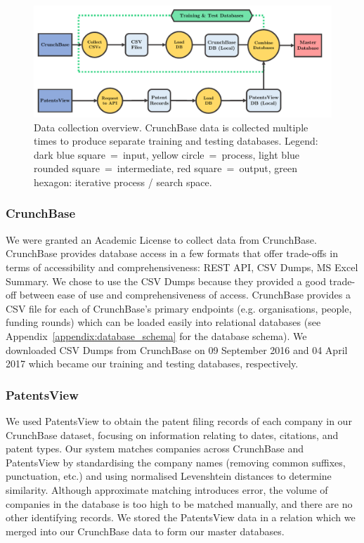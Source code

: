 \documentclass[../thesis/thesis.tex]{subfiles}
\begin{document}
\begin{figure}[!htb]
    \centering
    \includegraphics[width=\textwidth]{../figures/design/flowchart_data_collection}
    \caption[Data collection flowchart]{Data collection overview. CrunchBase data is collected multiple times to produce separate training and testing databases. Legend: dark blue square~=~input, yellow circle~=~process, light blue rounded square~=~intermediate, red square~=~output, green hexagon: iterative process / search space.}
    \label{fig:design:data_collection}
\end{figure}

\subsubsection{CrunchBase}

We were granted an Academic License to collect data from CrunchBase. CrunchBase provides database access in a few formats that offer trade-offs in terms of accessibility and comprehensiveness: REST API, CSV Dumps, MS Excel Summary. We chose to use the CSV Dumps because they provided a good trade-off between ease of use and comprehensiveness of access. CrunchBase provides a CSV file for each of CrunchBase's primary endpoints (e.g. organisations, people, funding rounds) which can be loaded easily into relational databases (see Appendix~\ref{appendix:database_schema} for the database schema). We downloaded CSV Dumps from CrunchBase on 09 September 2016 and 04 April 2017 which became our training and testing databases, respectively.

\subsubsection{PatentsView}

We used PatentsView to obtain the patent filing records of each company in our CrunchBase dataset, focusing on information relating to dates, citations, and patent types. Our system matches companies across CrunchBase and PatentsView by standardising the company names (removing common suffixes, punctuation, etc.) and using normalised Levenshtein distances to determine similarity. Although approximate matching introduces error, the volume of companies in the database is too high to be matched manually, and there are no other identifying records. We stored the PatentsView data in a relation which we merged into our CrunchBase data to form our master databases.
\end{document}
